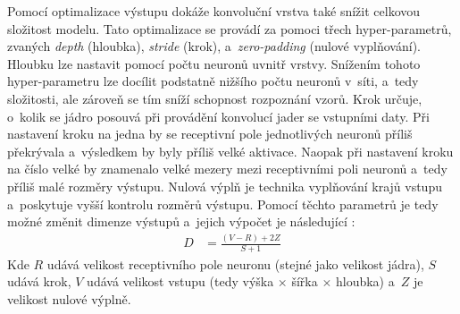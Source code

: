 Pomocí optimalizace výstupu dokáže konvoluční vrstva také snížit celkovou složitost modelu. Tato optimalizace se provádí za pomoci třech hyper-parametrů, zvaných \emph{depth} (hloubka), \emph{stride} (krok), a~\emph{zero-padding} (nulové vyplňování). Hloubku lze nastavit pomocí počtu neuronů uvnitř vrstvy. Snížením tohoto hyper-parametru lze docílit podstatně nižšího počtu neuronů v~síti, a~tedy složitosti, ale zároveň se tím sníží schopnost rozpoznání vzorů. Krok určuje, o~kolik se jádro posouvá při provádění konvolucí jader se vstupními daty. Při nastavení kroku na jedna by se receptivní pole jednotlivých neuronů příliš překrývala a~výsledkem by byly příliš velké aktivace. Naopak při nastavení kroku na číslo velké by znamenalo velké mezery mezi receptivními poli neuronů a~tedy příliš malé rozměry výstupu. Nulová výplň je technika vyplňování krajů vstupu a~poskytuje vyšší kontrolu rozměrů výstupu. Pomocí těchto parametrů je tedy možné změnit dimenze výstupů a~jejich výpočet je následující \cite{CNN}:
\begin{align}
    \label{eq:cnn}
    D &= \frac{(V - R) + 2Z}{S + 1}
\end{align}
Kde $R$ udává velikost receptivního pole neuronu (stejné jako velikost jádra), $S$ udává krok, $V$ udává velikost vstupu (tedy výška $\times$ šířka $\times$ hloubka) a~$Z$ je velikost nulové výplně.

